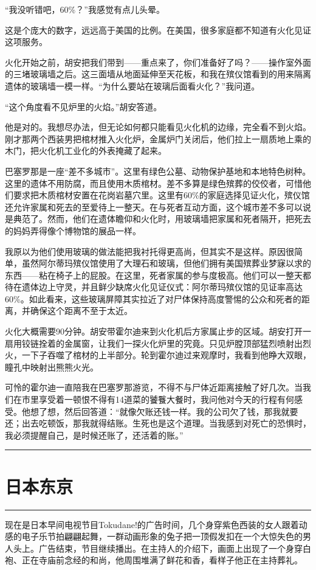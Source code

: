 \documentclass[12pt,oneside]{book}
\newcommand\hr{\par\noindent\hrule}
\begin{document}
“我没听错吧，60\%？”我感觉有点儿头晕。

这是个庞大的数字，远远高于美国的比例。在美国，很多家庭都不知道有火化见证这项服务。

火化开始之前，胡安把我们带到——重点来了，你们准备好了吗？——操作室外面的三堵玻璃墙之后。这三面墙从地面延伸至天花板，和我在殡仪馆看到的用来隔离遗体的玻璃墙一模一样。“为什么要站在玻璃后面看火化？”我问道。

“这个角度看不见炉里的火焰。”胡安答道。

他是对的。我想尽办法，但无论如何都只能看见火化机的边缘，完全看不到火焰。刚才那两个西装男把棺材推入火化炉，金属炉门关闭后，他们拉上一扇质地上乘的木门，把火化机工业化的外表掩藏了起来。

巴塞罗那是一座“差不多城市”。这里有绿色公墓、动物保护基地和本地特色树种。这里的遗体不用防腐，而且使用木质棺材。差不多算是绿色殡葬的佼佼者，可惜他们要求把木质棺材安置在花岗岩墓穴里。这里有60\%的家庭选择见证火化，殡仪馆还允许家属和死去的至爱待上一整天。在与死者互动方面，这个城市差不多可以说是典范了。然而，他们在遗体瞻仰和火化时，用玻璃墙把家属和死者隔开，把死去的妈妈弄得像个博物馆的展品一样。

我原以为他们使用玻璃的做法能把我衬托得更高尚，但其实不是这样。原因很简单，虽然阿尔蒂玛殡仪馆使用了大理石和玻璃，但他们拥有美国殡葬业梦寐以求的东西——粘在椅子上的屁股。在这里，死者家属的参与度极高。他们可以一整天都待在遗体边上守灵，并且鲜少缺席火化见证仪式：阿尔蒂玛殡仪馆的见证率高达60\%。如此看来，这些玻璃屏障其实拉近了对尸体保持高度警惕的公众和死者的距离，并确保这个距离不至于太近。

火化大概需要90分钟。胡安带霍尔迪来到火化机后方家属止步的区域。胡安打开一扇用铰链拴着的金属窗，让我们一探火化炉里的究竟。只见炉膛顶部猛烈喷射出烈火，一下子吞噬了棺材的上半部分。轮到霍尔迪过来观摩时，我看到他睁大双眼，瞳孔中映射出熊熊火光。

可怜的霍尔迪一直陪我在巴塞罗那游览，不得不与尸体近距离接触了好几次。当我们在市里享受着一顿恨不得有14道菜的饕餮大餐时，我问他对今天的行程有何感受。他想了想，然后回答道：“就像欠账还钱一样。我的公司欠了钱，那我就要还；出去吃顿饭，那我就得结账。生死也是这个道理。当我感到对死亡的恐惧时，我必须提醒自己，是时候还账了，还活着的账。”

\hr 

\section{日本东京}
\hr  

现在是日本早间电视节目Tokudane!的广告时间，几个身穿紫色西装的女人跟着动感的电子乐节拍翩翩起舞，一群动画形象的兔子把一顶假发扣在一个大惊失色的男人头上。广告结束，节目继续播出。在主持人的介绍下，画面上出现了一个身穿白袍、正在寺庙前念经的和尚，他周围堆满了鲜花和香，看样子他正在主持葬礼。
\end{document}
